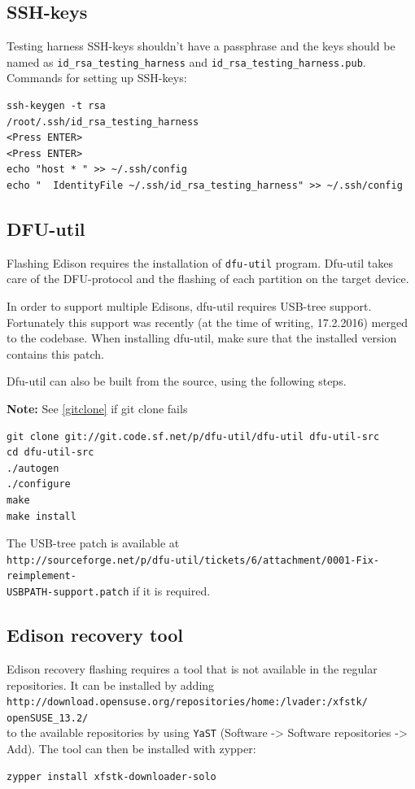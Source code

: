 \documentclass[a4paper,11pt]{article}
\newcommand{\note}{\textbf{Note: }}
\newcommand{\cmd}[1]{\texttt{#1}}
\begin{document}
\subsection*{SSH-keys}
\label{sshkeys}

Testing harness SSH-keys shouldn't have a passphrase and the keys should be named as \cmd{id\_rsa\_testing\_harness} and \cmd{id\_rsa\_testing\_harness.pub}. Commands for setting up SSH-keys:

\begin{lstlisting}
ssh-keygen -t rsa
/root/.ssh/id_rsa_testing_harness
<Press ENTER>
<Press ENTER>
echo "host * " >> ~/.ssh/config
echo "  IdentityFile ~/.ssh/id_rsa_testing_harness" >> ~/.ssh/config
\end{lstlisting}

\subsection*{DFU-util}
\label{dfuutil}

Flashing Edison requires the installation of \cmd{dfu-util} program. Dfu-util takes care of the DFU-protocol and the flashing of each partition on the target device.

In order to support multiple Edisons, dfu-util requires USB-tree support. Fortunately this support was recently (at the time of writing, 17.2.2016) merged to the codebase. When installing dfu-util, make sure that the installed version contains this patch. 

Dfu-util can also be built from the source, using the following steps.

\note See \ref{gitclone} if git clone fails

\begin{lstlisting}
git clone git://git.code.sf.net/p/dfu-util/dfu-util dfu-util-src
cd dfu-util-src
./autogen
./configure
make
make install
\end{lstlisting}

The USB-tree patch is available at \\ \cmd{http://sourceforge.net/p/dfu-util/tickets/6/attachment/0001-Fix-reimplement-\\USBPATH-support.patch} if it is required.

\subsection*{Edison recovery tool}

Edison recovery flashing requires a tool that is not available in the regular repositories. It can be installed by adding \\
\cmd{http://download.opensuse.org/repositories/home:/lvader:/xfstk/
openSUSE\_13.2/} \\
to the available repositories by using \cmd{YaST} (Software -> Software repositories -> Add). The tool can then be installed with zypper:
\begin{lstlisting}
zypper install xfstk-downloader-solo
\end{lstlisting}
\end{document}
